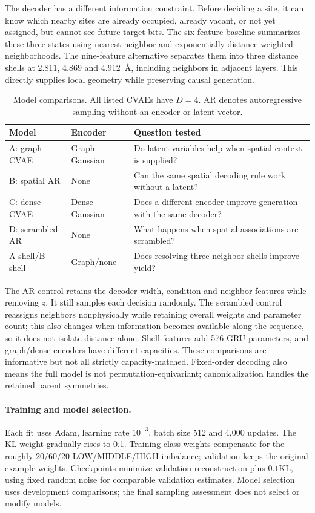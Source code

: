 \documentclass{article}
\begin{document}
The decoder has a different information constraint. Before deciding a site, it
can know which nearby sites are already occupied, already vacant, or not yet
assigned, but cannot see future target bits. The six-feature baseline summarizes
these three states using nearest-neighbor and exponentially distance-weighted
neighborhoods. The nine-feature alternative separates them into three distance
shells at 2.811, 4.869 and 4.912~\AA, including neighbors in adjacent layers.
This directly supplies local geometry while preserving causal generation.

\begin{table}[htbp]
\centering\small
\caption{Model comparisons. All listed CVAEs have $D=4$. AR denotes autoregressive
sampling without an encoder or latent vector.}
\label{tab:features}
\begin{tabularx}{\linewidth}{@{}l l X@{}}
\toprule Model & Encoder & Question tested\\
\midrule
A: graph CVAE & Graph Gaussian & Do latent variables help when spatial context is supplied?\\
B: spatial AR & None & Can the same spatial decoding rule work without a latent?\\
C: dense CVAE & Dense Gaussian & Does a different encoder improve generation with the same decoder?\\
D: scrambled AR & None & What happens when spatial associations are scrambled?\\
A-shell/B-shell & Graph/none & Does resolving three neighbor shells improve yield?\\
\bottomrule
\end{tabularx}
\end{table}

The AR control retains the decoder width, condition and neighbor features while
removing $z$. It still samples each decision randomly. The scrambled control
reassigns neighbors nonphysically while retaining overall weights and parameter
count; this also changes when information becomes available along the sequence,
so it does not isolate distance alone. Shell features add 576 GRU parameters,
and graph/dense encoders have different capacities. These comparisons are
informative but not all strictly capacity-matched. Fixed-order decoding also
means the full model is not permutation-equivariant; canonicalization handles
the retained parent symmetries.

\paragraph{Training and model selection.}
Each fit uses Adam, learning rate $10^{-3}$, batch size 512 and 4,000 updates.
The KL weight gradually rises to 0.1. Training class weights compensate for the
roughly 20/60/20 LOW/MIDDLE/HIGH imbalance; validation keeps the original example weights.
Checkpoints minimize validation reconstruction plus $0.1$KL, using fixed random
noise for comparable validation estimates. Model selection uses development
comparisons; the final sampling assessment does not select or modify models.
\end{document}
